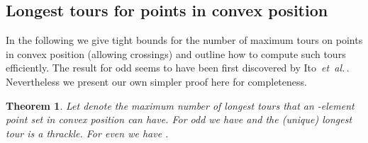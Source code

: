 \documentclass[11pt]{article}
\newtheorem{theorem}{Theorem}
\def\etal{{\it et~al.}\,}
\begin{document}
\subsection{Longest tours for points in convex position}

In the following we give tight bounds for the number of maximum tours
on  points in convex position (allowing crossings) and outline how to compute such
tours efficiently. The result for odd  seems to have been first
discovered by Ito~\etal\cite{IUY01}. Nevertheless we present
our own simpler proof here for completeness.

\begin{theorem} \label{Thm-T}
Let 
denote the maximum number of longest tours that
an -element point set in convex position can have.
For  odd we have  and the (unique) longest tour is a
thrackle. For  even we have .
\end{theorem}
\end{document}
